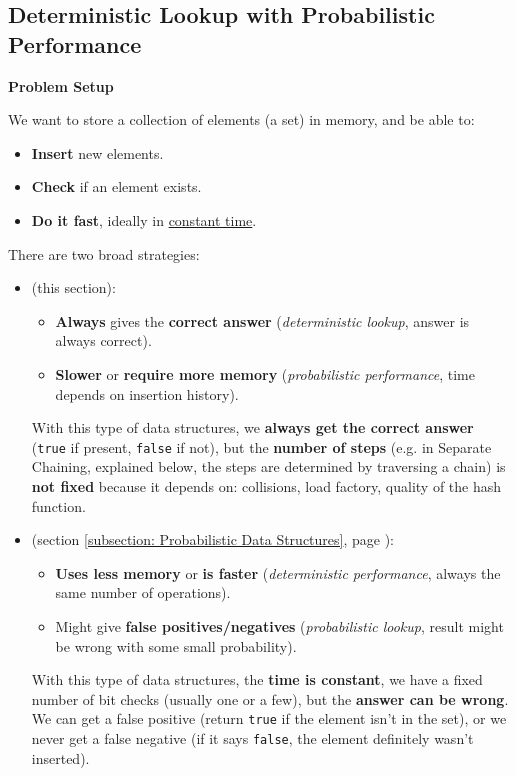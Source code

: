 \subsection{Deterministic Lookup with Probabilistic Performance}

\begin{flushleft}
    \textcolor{Red2}{ \textbf{Problem Setup}}
\end{flushleft}
We want to store a collection of elements (a set) in memory, and be able to:
\begin{itemize}
    \item \textbf{Insert} new elements.
    \item \textbf{Check} if an element exists.
    \item \textbf{Do it fast}, ideally in \underline{constant time}.
\end{itemize}
There are two broad strategies:
\begin{itemize}
    \item {} (this section):
    \begin{itemize}
        \item[\textcolor{Green3}{\faIcon{check}}] \textcolor{Green3}{\textbf{Always}} gives the \textcolor{Green3}{\textbf{correct answer}} (\emph{deterministic lookup}, answer is always correct).
        \item[\textcolor{Red2}{\faIcon{times}}] \textcolor{Red2}{\textbf{Slower}} or \textcolor{Red2}{\textbf{require more memory}} (\emph{probabilistic performance}, time depends on insertion history).
    \end{itemize}
    With this type of data structures, we \textbf{always get the correct answer} (\texttt{true} if present, \texttt{false} if not), but the \textbf{number of steps} (e.g. in Separate Chaining, explained below, the steps are determined by traversing a chain) is \textbf{not fixed} because it depends on: collisions, load factory, quality of the hash function.

    \item {} (section \ref{subsection: Probabilistic Data Structures}, page \pageref{subsection: Probabilistic Data Structures}):
    \begin{itemize}
        \item[\textcolor{Green3}{\faIcon{check}}] \textcolor{Green3}{\textbf{Uses less memory}} or \textcolor{Green3}{\textbf{is faster}} (\emph{deterministic performance}, always the same number of operations).
        \item[\textcolor{Red2}{\faIcon{times}}] Might give \textcolor{Red2}{\textbf{false positives/negatives}} (\emph{probabilistic lookup}, result might be wrong with some small probability).
    \end{itemize}
    With this type of data structures, the \textbf{time is constant}, we have a fixed number of bit checks (usually one or a few), but the \textbf{answer can be wrong}. We can get a false positive (return \texttt{true} if the element isn't in the set), or we never get a false negative (if it says \texttt{false}, the element definitely wasn't inserted).
\end{itemize}
